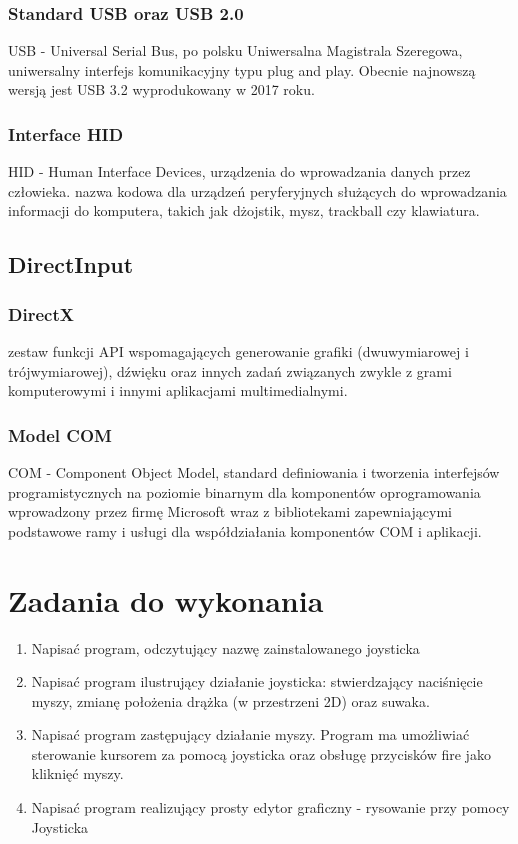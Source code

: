 \documentclass[a4paper,12pt]{extarticle}  %
\begin{document}
\subsubsection{Standard USB oraz USB 2.0}
USB - Universal Serial Bus, po polsku Uniwersalna Magistrala Szeregowa, uniwersalny interfejs komunikacyjny typu plug and play.
Obecnie najnowszą wersją jest USB 3.2 wyprodukowany w 2017 roku.
\subsubsection{Interface HID}
HID - Human Interface Devices, urządzenia do wprowadzania danych przez człowieka. nazwa kodowa dla urządzeń peryferyjnych służących do wprowadzania informacji do komputera, takich jak dżojstik, mysz, trackball czy klawiatura.
\subsection{DirectInput}
\subsubsection{DirectX}
zestaw funkcji API wspomagających generowanie grafiki (dwuwymiarowej i trójwymiarowej), dźwięku oraz innych zadań związanych zwykle z grami komputerowymi i innymi aplikacjami multimedialnymi.
\subsubsection{Model COM}
COM - Component Object Model, standard definiowania i tworzenia interfejsów programistycznych na poziomie binarnym dla komponentów oprogramowania wprowadzony przez firmę Microsoft wraz z bibliotekami zapewniającymi podstawowe ramy i usługi dla współdziałania komponentów COM i aplikacji. 
\section{Zadania do wykonania}
\begin{enumerate}
	\item Napisać program, odczytujący nazwę zainstalowanego joysticka
	\item Napisać program ilustrujący działanie joysticka: stwierdzający naciśnięcie myszy, zmianę położenia drążka (w przestrzeni 2D) oraz suwaka.
	\item Napisać program zastępujący działanie myszy. Program ma umożliwiać sterowanie kursorem za pomocą joysticka oraz obsługę przycisków fire jako kliknięć myszy.
	\item Napisać program realizujący prosty edytor graficzny - rysowanie przy pomocy Joysticka
\end{enumerate}
\end{document}
